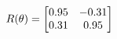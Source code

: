 \documentclass[preview]{standalone}
\begin{document}
\begin{align*}
\special{dvisvgm:raw <g id='unique000'>}R(\theta) = \begin{bmatrix}0.95 & -0.31\\0.31 & 0.95\end{bmatrix}\special{dvisvgm:raw </g>}
\end{align*}
\end{document}
